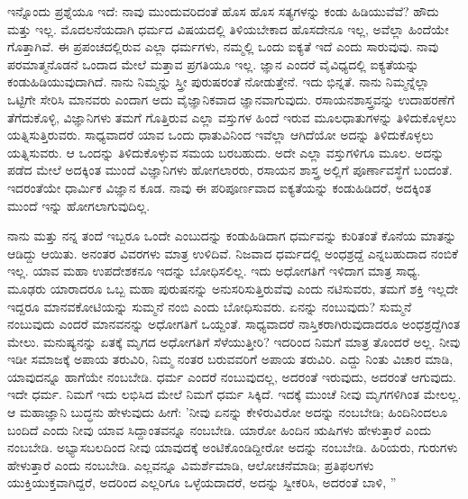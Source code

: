 ಇನ್ನೊಂದು ಪ್ರಶ್ನೆಯೂ ಇದೆ: ನಾವು ಮುಂದುವರಿದಂತೆ ಹೊಸ ಹೊಸ ಸತ್ಯಗಳನ್ನು ಕಂಡು ಹಿಡಿಯುವೆವೆ? ಹೌದು ಮತ್ತು ಇಲ್ಲ. ಮೊದಲನೆಯದಾಗಿ ಧರ್ಮದ ವಿಷಯದಲ್ಲಿ ತಿಳಿಯಬೇಕಾದ ಹೊಸದೇನೂ ಇಲ್ಲ, ಅವೆಲ್ಲಾ ಹಿಂದೆಯೇ ಗೊತ್ತಾಗಿವೆ. ಈ ಪ್ರಪಂಚದಲ್ಲಿರುವ ಎಲ್ಲಾ ಧರ್ಮಗಳು, ನಮ್ಮಲ್ಲಿ ಒಂದು ಐಕ್ಯತೆ ಇದೆ ಎಂದು ಸಾರುವುವು. ನಾವು ಪರಮಾತ್ಮನೊಡನೆ ಒಂದಾದ ಮೇಲೆ ಮತ್ತಾವ ಪ್ರಗತಿಯೂ ಇಲ್ಲ. ಜ್ಞಾನ ಎಂದರೆ ವೈವಿಧ್ಯದಲ್ಲಿ ಐಕ್ಯತೆಯನ್ನು ಕಂಡುಹಿಡಿಯುವುದಾಗಿದೆ. ನಾನು ನಿಮ್ಮನ್ನು ಸ್ತ್ರೀ ಪುರುಷರಂತೆ ನೋಡುತ್ತೇನೆ. ಇದು ಭಿನ್ನತೆ. ನಾನು ನಿಮ್ಮನ್ನೆಲ್ಲಾ ಒಟ್ಟಿಗೇ ಸೇರಿಸಿ ಮಾನವರು ಎಂದಾಗ ಅದು ವೈಜ್ಞಾನಿಕವಾದ ಜ್ಞಾನವಾಗುವುದು. ರಸಾಯನಶಾಸ್ತ್ರವನ್ನು ಉದಾಹರಣೆಗೆ ತೆಗೆದುಕೊಳ್ಳಿ, ವಿಜ್ಞಾನಿಗಳು ತಮಗೆ ಗೊತ್ತಿರುವ ಎಲ್ಲಾ ವಸ್ತುಗಳ ಹಿಂದೆ ಇರುವ ಮೂಲಧಾತುಗಳನ್ನು ತಿಳಿದುಕೊಳ್ಳಲು ಯತ್ನಿಸುತ್ತಿರುವರು. ಸಾಧ್ಯವಾದರೆ ಯಾವ ಒಂದು ಧಾತುವಿನಿಂದ ಇವೆಲ್ಲಾ ಆಗಿದೆಯೋ ಅದನ್ನು ತಿಳಿದುಕೊಳ್ಳಲು ಯತ್ನಿಸುವರು. ಆ ಒಂದನ್ನು ತಿಳಿದುಕೊಳ್ಳುವ ಸಮಯ ಬರಬಹುದು. ಅದೇ ಎಲ್ಲಾ ವಸ್ತುಗಳಿಗೂ ಮೂಲ. ಅದನ್ನು ಪಡೆದ ಮೇಲೆ ಅದಕ್ಕಿಂತ ಮುಂದೆ ವಿಜ್ಞಾನಿಗಳು ಹೋಗಲಾರರು, ರಸಾಯನ ಶಾಸ್ತ್ರ ಅಲ್ಲಿಗೆ ಪೂರ್ಣಾವಸ್ಥೆಗೆ ಬಂದಂತೆ. ಇದರಂತೆಯೇ ಧಾರ್ಮಿಕ ವಿಜ್ಞಾನ ಕೂಡ. ನಾವು ಈ ಪರಿಪೂರ್ಣವಾದ ಐಕ್ಯತೆಯನ್ನು ಕಂಡುಹಿಡಿದರೆ, ಅದಕ್ಕಿಂತ ಮುಂದೆ ಇನ್ನು ಹೋಗಲಾಗುವುದಿಲ್ಲ.

ನಾನು ಮತ್ತು ನನ್ನ ತಂದೆ ಇಬ್ಬರೂ ಒಂದೇ ಎಂಬುದನ್ನು ಕಂಡುಹಿಡಿದಾಗ ಧರ್ಮವನ್ನು ಕುರಿತಂತೆ ಕೊನೆಯ ಮಾತನ್ನು ಆಡಿದ್ದು ಆಯಿತು. ಅನಂತರ ವಿವರಗಳು ಮಾತ್ರ ಉಳಿದಿವೆ. ನಿಜವಾದ ಧರ್ಮದಲ್ಲಿ ಅಂಧಶ್ರದ್ದೆ ಎನ್ನಬಹುದಾದ ನಂಬಿಕೆ ಇಲ್ಲ. ಯಾವ ಮಹಾ ಉಪದೇಶಕನೂ ಇದನ್ನು ಬೋಧಿಸಲಿಲ್ಲ. ಇದು ಅಧೋಗತಿಗೆ ಇಳಿದಾಗ ಮಾತ್ರ ಸಾಧ್ಯ. ಮೂಢರು ಯಾರಾದರೂ ಒಬ್ಬ ಮಹಾ ಪುರುಷನನ್ನು ಅನುಸರಿಸುತ್ತಿರುವೆವು ಎಂದು ನಟಿಸುವರು, ತಮಗೆ ಶಕ್ತಿ ಇಲ್ಲದೇ ಇದ್ದರೂ ಮಾನವಕೋಟಿಯನ್ನು ಸುಮ್ಮನೆ ನಂಬಿ ಎಂದು ಬೋಧಿಸುವರು. ಏನನ್ನು ನಂಬುವುದು? ಸುಮ್ಮನೆ ನಂಬುವುದು ಎಂದರೆ ಮಾನವನನ್ನು ಅಧೋಗತಿಗೆ ಒಯ್ದಂತೆ. ಸಾಧ್ಯವಾದರೆ ನಾಸ್ತಿಕರಾಗಿರುವುದಾದರೂ ಅಂಧಶ್ರದ್ದೆಗಿಂತ ಮೇಲು. ಮನುಷ್ಯನನ್ನು ಏತಕ್ಕೆ ಮೃಗದ ಅಧೋಗತಿಗೆ ಸೆಳೆಯುತ್ತೀರಿ? ಇದರಿಂದ ನಿಮಗೆ ಮಾತ್ರ ತೊಂದರೆ ಅಲ್ಲ. ನೀವು ಇಡೀ ಸಮಾಜಕ್ಕೆ ಅಪಾಯ ತರುವಿರಿ, ನಿಮ್ಮ ನಂತರ ಬರುವವರಿಗೆ ಅಪಾಯ ತರುವಿರಿ. ಎದ್ದು ನಿಂತು ವಿಚಾರ ಮಾಡಿ, ಯಾವುದನ್ನೂ ಹಾಗೆಯೇ ನಂಬಬೇಡಿ. ಧರ್ಮ ಎಂದರೆ ನಂಬುವುದಲ್ಲ, ಅದರಂತೆ ಇರುವುದು, ಅದರಂತೆ ಆಗುವುದು. ಇದೇ ಧರ್ಮ. ನಿಮಗೆ ಇದು ಲಭಿಸಿದ ಮೇಲೆ ನಿಮಗೆ ಧರ್ಮ ಸಿಕ್ಕಿದೆ. ಇದಕ್ಕೆ ಮುಂಚೆ ನೀವು ಮೃಗಗಳಿಗಿಂತ ಮೇಲಲ್ಲ. ಆ ಮಹಾಜ್ಞಾನಿ ಬುದ್ಧನು ಹೇಳುವುದು ಹೀಗೆ: 'ನೀವು ಏನನ್ನು ಕೇಳಿರುವಿರೋ ಅದನ್ನು ನಂಬಬೇಡಿ; ಹಿಂದಿನಿಂದಲೂ ಬಂದಿದೆ ಎಂದು ನೀವು ಯಾವ ಸಿದ್ದಾಂತವನ್ನೂ ನಂಬಬೇಡಿ. ಯಾರೋ ಹಿಂದಿನ ಋಷಿಗಳು ಹೇಳುತ್ತಾರೆ ಎಂದು ನಂಬಬೇಡಿ. ಅಭ್ಯಾಸಬಲದಿಂದ ನೀವು ಯಾವುದಕ್ಕೆ ಅಂಟಿಕೊಂಡಿದ್ದೀರೋ ಅದನ್ನು ನಂಬಬೇಡಿ. ಹಿರಿಯರು, ಗುರುಗಳು ಹೇಳುತ್ತಾರೆ ಎಂದು ನಂಬಬೇಡಿ. ಎಲ್ಲವನ್ನೂ ವಿಮರ್ಶೆಮಾಡಿ, ಆಲೋಚನೆಮಾಡಿ; ಪ್ರತಿಫಲಗಳು ಯುಕ್ತಿಯುಕ್ತವಾಗಿದ್ದರೆ, ಅದರಿಂದ ಎಲ್ಲರಿಗೂ ಒಳ್ಳೆಯದಾದರೆ, ಅದನ್ನು ಸ್ವೀಕರಿಸಿ, ಅದರಂತೆ ಬಾಳಿ, ''

